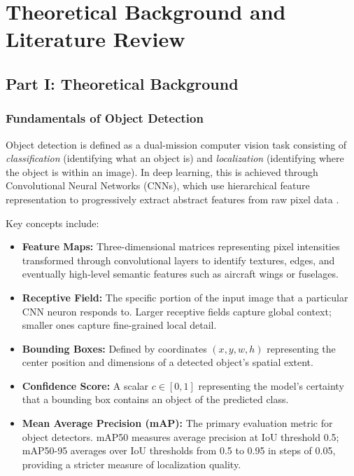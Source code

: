 \documentclass[12pt,a4paper]{report}
\begin{document}
\chapter{Theoretical Background and Literature Review}
\label{chap:theory}

\section{Part I: Theoretical Background}

\subsection{Fundamentals of Object Detection}

Object detection is defined as a dual-mission computer vision task consisting of
\textit{classification} (identifying what an object is) and \textit{localization}
(identifying where the object is within an image). In deep learning, this is achieved
through Convolutional Neural Networks (CNNs), which use hierarchical feature
representation to progressively extract abstract features from raw pixel data
\cite{lecun2015deep}.

Key concepts include:

\begin{itemize}
  \item \textbf{Feature Maps:} Three-dimensional matrices representing pixel
  intensities transformed through convolutional layers to identify textures, edges,
  and eventually high-level semantic features such as aircraft wings or fuselages.

  \item \textbf{Receptive Field:} The specific portion of the input image that a
  particular CNN neuron responds to. Larger receptive fields capture global context;
  smaller ones capture fine-grained local detail.

  \item \textbf{Bounding Boxes:} Defined by coordinates $(x, y, w, h)$ representing
  the center position and dimensions of a detected object's spatial extent.

  \item \textbf{Confidence Score:} A scalar $c \in [0,1]$ representing the model's
  certainty that a bounding box contains an object of the predicted class.

  \item \textbf{Mean Average Precision (mAP):} The primary evaluation metric for
  object detectors. mAP50 measures average precision at IoU threshold 0.5;
  mAP50-95 averages over IoU thresholds from 0.5 to 0.95 in steps of 0.05,
  providing a stricter measure of localization quality.
\end{itemize}
\end{document}
